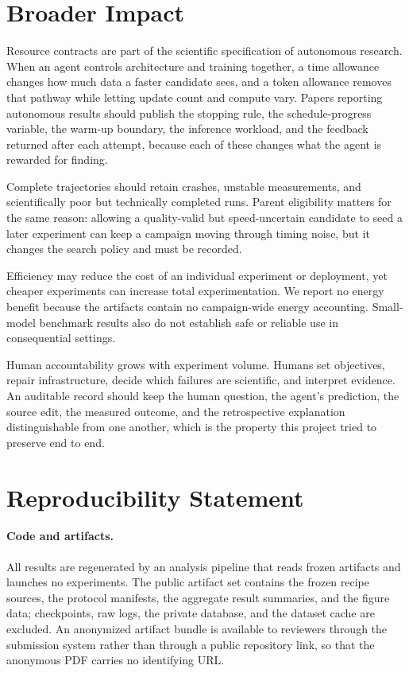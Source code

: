 \documentclass{article}
\begin{document}
\clearpage
\section{Broader Impact}\label{partthree}
Resource contracts are part of the scientific specification of autonomous research. When an agent controls architecture and training together, a time allowance changes how much data a faster candidate sees, and a token allowance removes that pathway while letting update count and compute vary. Papers reporting autonomous results should publish the stopping rule, the schedule-progress variable, the warm-up boundary, the inference workload, and the feedback returned after each attempt, because each of these changes what the agent is rewarded for finding.

Complete trajectories should retain crashes, unstable measurements, and scientifically poor but technically completed runs. Parent eligibility matters for the same reason: allowing a quality-valid but speed-uncertain candidate to seed a later experiment can keep a campaign moving through timing noise, but it changes the search policy and must be recorded.

Efficiency may reduce the cost of an individual experiment or deployment, yet cheaper experiments can increase total experimentation. We report no energy benefit because the artifacts contain no campaign-wide energy accounting. Small-model benchmark results also do not establish safe or reliable use in consequential settings.

Human accountability grows with experiment volume. Humans set objectives, repair infrastructure, decide which failures are scientific, and interpret evidence. An auditable record should keep the human question, the agent's prediction, the source edit, the measured outcome, and the retrospective explanation distinguishable from one another, which is the property this project tried to preserve end to end.
\label{partthreeend}

\clearpage
\appendix
\section{Reproducibility Statement}\label{app:repro}
\paragraph{Code and artifacts.} All results are regenerated by an analysis pipeline that reads frozen artifacts and launches no experiments. The public artifact set contains the frozen recipe sources, the protocol manifests, the aggregate result summaries, and the figure data; checkpoints, raw logs, the private database, and the dataset cache are excluded. An anonymized artifact bundle is available to reviewers through the submission system rather than through a public repository link, so that the anonymous PDF carries no identifying URL.
\end{document}
